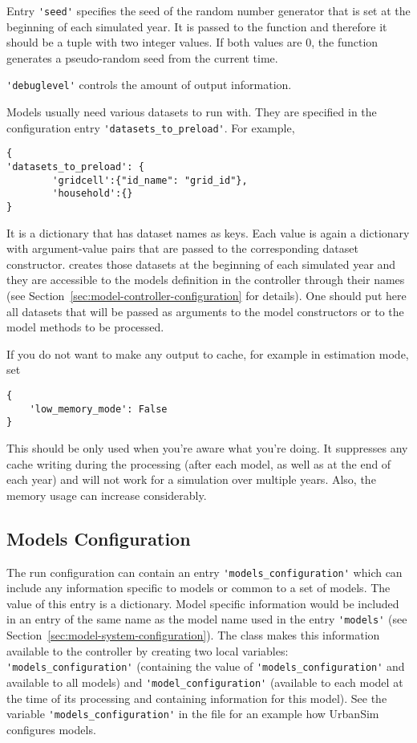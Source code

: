 Entry \verb|'seed'| specifies the seed of the random number generator that is set at
the beginning of each simulated year. It is passed to the  \numpyindex
function  and therefore it should be a tuple with two integer
values. If both values are 0, the function generates a pseudo-random seed
from the current time.

\verb|'debuglevel'| controls the amount of output information.

Models \modelsindex usually need various datasets \datasetindex to run with. They are specified in the
configuration entry \verb|'datasets_to_preload'|. For example,
\begin{verbatim}
{
'datasets_to_preload': {
        'gridcell':{"id_name": "grid_id"},
        'household':{}
}
\end{verbatim}
It is a dictionary that has dataset \datasetindex names as keys. Each value is again a
dictionary with argument-value pairs that are passed to the corresponding
dataset \datasetindex constructor.  \modelsindex creates those datasets \datasetindex at the
beginning of each simulated year and they are accessible to the models \modelsindex
definition in the controller through their names (see
Section~\ref{sec:model-controller-configuration} for details). One should put
here all datasets \datasetindex that will be passed as arguments to the model constructors
or to the model methods to be processed.

If you do not want to make any output to cache, for example in estimation mode, set
\begin{verbatim}
{
    'low_memory_mode': False
}
\end{verbatim}
This should be only used when you're aware what you're doing.
It suppresses any cache writing during the processing (after each model, as
well as at the end of each year) and will not work for a simulation
over multiple years. Also, the memory usage can increase considerably.


\subsection{Models Configuration}
\label{sec:models-configuration}
%
The run configuration can contain an entry \verb|'models_configuration'| \modelsindex which can
include any information specific to models \modelsindex or common to a set of models. \modelsindex The
value of this entry is a dictionary.  Model specific information would be
included in an entry of the same name as the model name used in the entry
\verb|'models'| (see Section~\ref{sec:model-system-configuration}). The
 \modelsindex class makes this information available to the controller
by creating two local variables: \verb|'models_configuration'| \modelsindex (containing the
value of \verb|'models_configuration'| \modelsindex and available to all models) \modelsindex and
\verb|'model_configuration'| \modelsindex (available to each model at the time of its
processing and containing information for this model). See the variable
\verb|'models_configuration'| \modelsindex in the file  for an
example how UrbanSim configures models. \modelsindex

